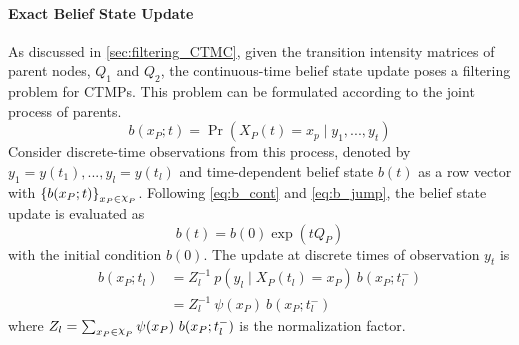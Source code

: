 \paragraph*{Exact Belief State Update}
\label{par:bs_exact}
As discussed in \cref{sec:filtering_CTMC}, given the transition intensity matrices of parent nodes, $ Q_1 $ and $ Q_2 $, the continuous-time belief state update poses a filtering problem for CTMPs. This problem can be formulated according to the joint process of parents.
\begin{equation}
b(x_P; t) = \operatorname{Pr}( X_P(t) = x_{p} \mid y_{1}, ..., y_{t})
\end{equation}
Consider discrete-time observations from this process, denoted by $ y_{1}=y(t_{1}), ..., y_{l}=y(t_{l}) $ and time-dependent belief state $ b(t) $ as a row vector with $ \left\lbrace b(x_P;t)\right\rbrace_{x_P \in \rchi_P} $. Following \autoref{eq:b_cont} and \autoref{eq:b_jump}, the belief state update is evaluated as
\begin{equation}
b(t) = b(0) \exp(tQ_P)
\end{equation}
with the initial condition $ b(0) $.
The update at discrete times of observation $ y_{t} $ is
\begin{align}
b(x_P; t_{l}) &= Z_{l}^{-1}\ {p(y_{l} \mid X_P(t_{l})=x_P)}\ {b(x_P; t_{l}^{-})} \\ & = Z_{l}^{-1}\ \psi(x_P) \ {b(x_P; t_{l}^{-})}
\label{eq:bs_exact}
\end{align}
where $ Z_{l} = \sum_{x_P\in \rchi_P} \psi(x_P)\ b(x_P; t_{l}^{-}) $ is the normalization factor.
